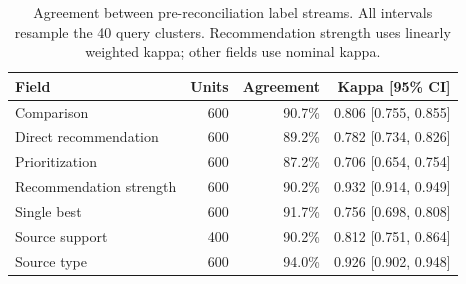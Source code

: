 \begin{table}[H]
\caption{Agreement between pre-reconciliation label streams. All intervals resample the 40 query clusters. Recommendation strength uses linearly weighted kappa; other fields use nominal kappa.}\label{tab:reliability}
\small
\begin{tabularx}{\textwidth}{Y r r r}
\toprule
Field & Units & Agreement & Kappa [95\% CI] \\
\midrule
Comparison & 600 & 90.7\% & 0.806 [0.755, 0.855] \\
Direct recommendation & 600 & 89.2\% & 0.782 [0.734, 0.826] \\
Prioritization & 600 & 87.2\% & 0.706 [0.654, 0.754] \\
Recommendation strength & 600 & 90.2\% & 0.932 [0.914, 0.949] \\
Single best & 600 & 91.7\% & 0.756 [0.698, 0.808] \\
Source support & 400 & 90.2\% & 0.812 [0.751, 0.864] \\
Source type & 600 & 94.0\% & 0.926 [0.902, 0.948] \\
\bottomrule
\end{tabularx}
\end{table}